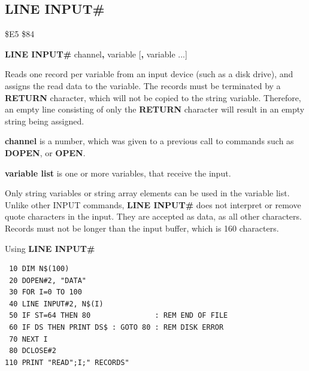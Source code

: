 
\newpage
\subsection{LINE INPUT\#}
\begin{description}[leftmargin=2cm,style=nextline]
\item [Token:]    \$E5 \$84

\item [Format:]   {\bf LINE INPUT\#} channel{\bf,} variable [{\bf,} variable ...]

\item [Usage:]    Reads one record per variable from an input device (such as a disk drive), and assigns the read data to the variable.
                  The records must be terminated by a {\bf RETURN} character, which will not be copied to the string variable. Therefore, an empty line consisting of only the {\bf RETURN} character will result in an empty string being assigned.
               
                  {\bf channel} is a number, which was given to a previous call to commands such as {\bf DOPEN}, or {\bf OPEN}.
               
                  {\bf variable list} is one or more variables, that receive the input.

\item [Remarks:]  Only string variables or string array elements can be used in the variable list. Unlike other INPUT commands, {\bf LINE INPUT\#} does not interpret or remove quote characters in the input. They are accepted as data, as all other characters.
                  Records must not be longer than the input buffer, which is 160 characters.

\item [Example:]  Using {\bf LINE INPUT\#}

\begin{tcolorbox}[colback=black,coltext=white]
\verbatimfont{\codefont}
\begin{verbatim}
 10 DIM N$(100)
 20 DOPEN#2, "DATA"
 30 FOR I=0 TO 100
 40 LINE INPUT#2, N$(I)
 50 IF ST=64 THEN 80               : REM END OF FILE
 60 IF DS THEN PRINT DS$ : GOTO 80 : REM DISK ERROR
 70 NEXT I
 80 DCLOSE#2
110 PRINT "READ";I;" RECORDS"
\end{verbatim}
\end{tcolorbox}
\end{description}

